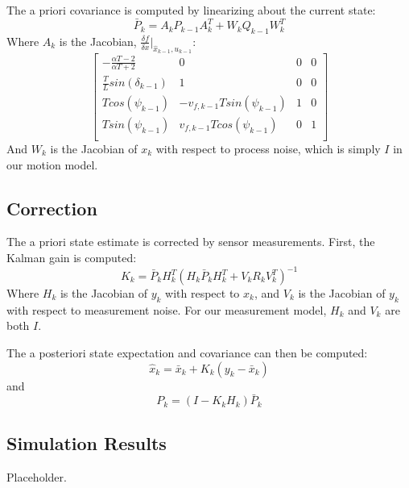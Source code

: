 \documentclass[11pt]{article} %
\begin{document}
The a priori covariance is computed by linearizing about the current state:
\begin{equation}
\bar{P}_k = A_kP_{k-1}A_k^T + W_kQ_{k-1}W_k^T
\end{equation}
Where $A_k$ is the Jacobian, $\frac{\delta f}{\delta x} | _{\hat{x}_{k-1}, u_{k-1}}$:
\renewcommand{\arraystretch}{1.4}
\begin{equation}
\left[ \begin{array}{cccc}
-\frac{\alpha T - 2}{\alpha T + 2} & 0 & 0 & 0 \\
\frac{T}{L} sin( \delta _{k-1} ) & 1 & 0 & 0 \\
T cos(\psi _{k-1}) & - v_{f,k-1} T sin( \psi _{k-1}) & 1 & 0 \\
T sin(\psi _{k-1}) & v_{f,k-1} T cos ( \psi _{k-1}) & 0 & 1 \\
\end{array} \right]
\end{equation}
\renewcommand{\arraystretch}{1}
And $W_k$ is the Jacobian of $x_k$ with respect to process noise, which is simply $I$ in our motion model.

\subsection{Correction}

The a priori state estimate is corrected by sensor measurements.  First, the Kalman gain is computed:
\begin{equation}
K_k = \bar{P}_k H_k^T ( H_k \bar{P}_k H_k^T + V_k R_k V_k^T ) ^{-1}
\end{equation}
Where $H_k$ is the Jacobian of $y_k$ with respect to $x_k$, and $V_k$ is the Jacobian of $y_k$ with respect to measurement noise.   For our measurement model, $H_k$ and $V_k$ are both $I$.

The a posteriori state expectation and covariance can then be computed:
\begin{equation}
\hat{x}_k = \bar{x}_k + K_k (y_k - \bar{x}_k)
\end{equation}
and
\begin{equation}
P_k = (I - K_k H_k) \bar{P}_k
\end{equation}

\subsection{Simulation Results}

Placeholder.

\end{document}
